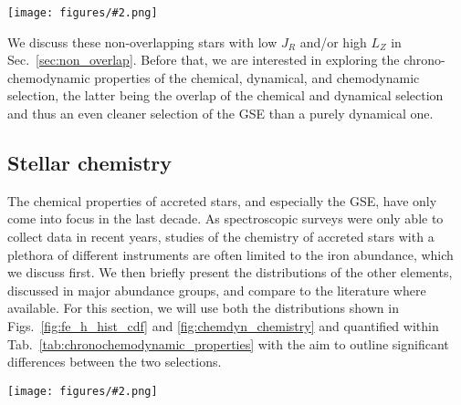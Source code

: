 \documentclass[fleqn,usenatbib]{mnras}
\newcommand{\codeicon}{{\faCloudDownload}}
\newcommand{\codelink}[1]{\href{https://github.com/svenbuder/Accreted-stars-in-GALAH-DR3/tree/main/figures/#1.ipynb}{\codeicon}\,\,}
\newcommand{\oscaption}[2]{\caption{#2 \codelink{#1}}}
\newcommand{\figuretextwidth}[4]{\begin{figure*} \centering \texttt{[image: figures/\#2.png]}\oscaption{#3}{#4}\label{fig:#2} \end{figure*}}
\begin{document}
\figuretextwidth{17cm}{fe_h_hist_cdf}{chronochemodynamic_comparison}{
\textbf{Relative (top panels) and cumulative (bottom panels) distribution of iron abundances [Fe/H] for our samples of accreted stars.} \textbf{Left panels a and c} show chemically selected accreted stars and compare with the results by \citet{Das2020}.
\textbf{Right panels b and d} show the dynamical selections of the GSE by our work and \citet{Feuillet2020, Feuillet2021} as well as \citet{Naidu2020}.
}

We discuss these non-overlapping stars with low $J_R$ and/or high $L_Z$ in Sec.~\ref{sec:non_overlap}. Before that, we are interested in exploring the chrono-chemodynamic properties of the chemical, dynamical, and chemodynamic selection, the latter being the overlap of the chemical and dynamical selection and thus an even cleaner selection of the GSE than a purely dynamical one.

\subsection{Stellar chemistry} \label{sec:gse_stellar_chemistry}

The chemical properties of accreted stars, and especially the GSE, have only come into focus in the last decade. As spectroscopic surveys were only able to collect data in recent years, studies of the chemistry of accreted stars with a plethora of different instruments are often limited to the iron abundance, which we discuss first. We then briefly present the distributions of the other elements, discussed in major abundance groups, and compare to the literature where available. For this section, we will use both the distributions shown in Figs.~\ref{fig:fe_h_hist_cdf} and \ref{fig:chemdyn_chemistry} and quantified within Tab.~\ref{tab:chronochemodynamic_properties} with the aim to outline significant differences between the two selections.

\figuretextwidth{17cm}{chemdyn_chemistry}{chronochemodynamic_comparison}{
\textbf{Abundance distributions [X/Fe] (and absolute abundance for Li) as a function of iron abundance [Fe/H] for elements X (noted in each panel).} Shown are the distributions of all GALAH+ DR3 stars (black contours) as well as those of the chemically selected (orange contours) and dynamically selected (red contours). Quantities of each distributions are listed in Tab.~\ref{tab:chronochemodynamic_properties} together with the distribution of the stars within both the chemical and dynamical selection.
}
\end{document}
